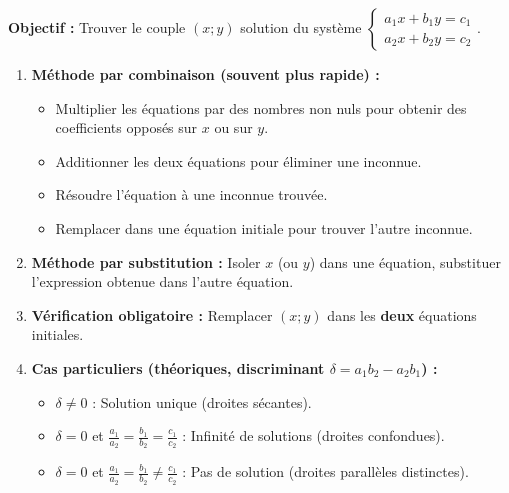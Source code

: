 \documentclass[11pt]{article}
\begin{document}
\begin{methode}
    \textbf{Objectif :} Trouver le couple $(x;y)$ solution du système $\begin{cases} a_1x+b_1y=c_1 \\ a_2x+b_2y=c_2 \end{cases}$.
    \begin{enumerate}
        \item \textbf{Méthode par combinaison (souvent plus rapide) :}
        \begin{itemize}
            \item Multiplier les équations par des nombres non nuls pour obtenir des coefficients opposés sur $x$ ou sur $y$.
            \item Additionner les deux équations pour éliminer une inconnue.
            \item Résoudre l'équation à une inconnue trouvée.
            \item Remplacer dans une équation initiale pour trouver l'autre inconnue.
        \end{itemize}
        \item \textbf{Méthode par substitution :} Isoler $x$ (ou $y$) dans une équation, substituer l'expression obtenue dans l'autre équation.
        \item \textbf{Vérification obligatoire :} Remplacer $(x;y)$ dans les \textbf{deux} équations initiales.
        \item \textbf{Cas particuliers (théoriques, discriminant $\delta = a_1b_2 - a_2b_1$) :}
        \begin{itemize}
            \item $\delta \neq 0$ : Solution unique (droites sécantes).
            \item $\delta = 0$ et $\frac{a_1}{a_2} = \frac{b_1}{b_2} = \frac{c_1}{c_2}$ : Infinité de solutions (droites confondues).
            \item $\delta = 0$ et $\frac{a_1}{a_2} = \frac{b_1}{b_2} \neq \frac{c_1}{c_2}$ : Pas de solution (droites parallèles distinctes).
        \end{itemize}
    \end{enumerate}
\end{methode}
\end{document}
